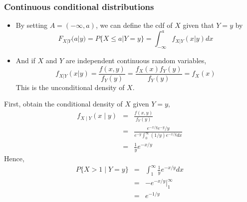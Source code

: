 \documentclass[slidestop,compress,mathserif]{beamer}
\begin{document}
\begin{frame}\frametitle{Continuous conditional distributions}
\begin{itemize}
\item By setting $A = (-\infty, a)$, we can define the cdf of $X$ given that $Y = y$ by
$$F_{X|Y}(a|y) = P\{X \leq a|Y = y\} = \int_{-\infty}^a f_{X|Y}(x|y)dx$$
\item And if $X$ and $Y$ are independent continuous random variables,
$$f_{X|Y}(x|y) = \frac{f(x, y)}{f_Y(y)} = \frac{f_X(x)f_Y(y)}{f_Y(y)} = f_X(x)$$
This is the unconditional density of $X$.
\end{itemize}
\end{frame}

\begin{frame}%
\pause
{\small{
\begin{multicols}{2}
First, obtain the conditional density of $X$ given $Y = y$,
\begin{eqnarray*}
f_{X \mid Y}(x \mid y) &=& \frac{f(x, y)}{f_Y(y)}\\
&=&
\frac{e^{-x/y}e^{-y}/y}{e^{-y}\int_0^{\infty}(1/y)e^{-x/y}dx}\\
&=&
\frac{1}{y}e^{-x/y}
\end{eqnarray*}
\pause
Hence,
\begin{eqnarray*}
P\{X > 1 \mid Y = y\} &=& \int_1^{\infty}\frac{1}{y}e^{-x/y}dx\\
&=&
-e^{-x/y}|_1^{\infty}\\
&=&
e^{-1/y}
\end{eqnarray*}
\end{multicols}
}}

\end{frame}
\end{document}
